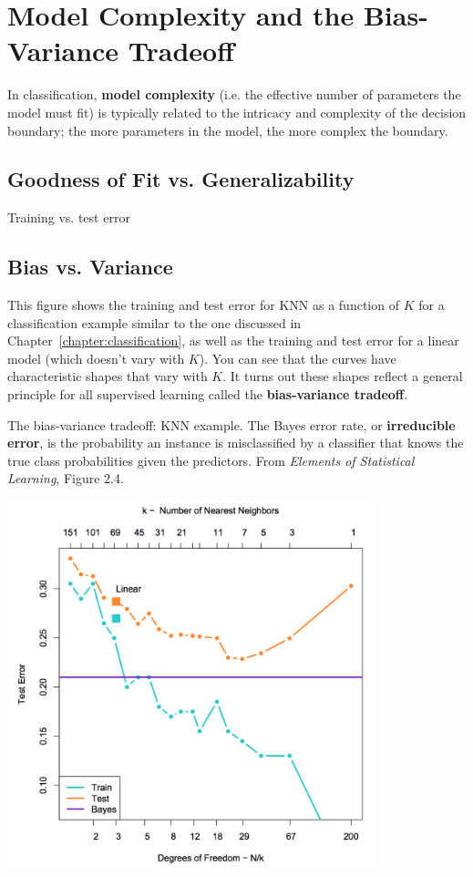 \chapter{Model Complexity and the Bias-Variance Tradeoff \label{chapter:biasvariance}}

In classification, \textbf{model complexity} (i.e. the effective number of parameters the model must fit) is typically related to the intricacy and complexity of the decision boundary; the more parameters in the model, the more complex the boundary.

\section{Goodness of Fit vs. Generalizability}

Training vs. test error

\section{Bias vs. Variance}

This figure shows the training and test error for KNN as a function of $K$ for a classification example similar to the one discussed in Chapter~\ref{chapter:classification}, as well as the training and test error for a linear model (which doesn't vary with $K$). You can see that the curves have characteristic shapes that vary with $K$. It turns out these shapes reflect a general principle for all supervised learning called the \textbf{bias-variance tradeoff}. 

The bias-variance tradeoff: KNN example. The Bayes error rate, or \textbf{irreducible error}, is the probability an instance is misclassified by a classifier that knows the true class probabilities given the predictors. From \emph{Elements of Statistical Learning}, Figure 2.4.

\begin{center}
\includegraphics[width=0.8\textwidth]{img/l03-knn-linear-tradeoff.png}
\end{center}

